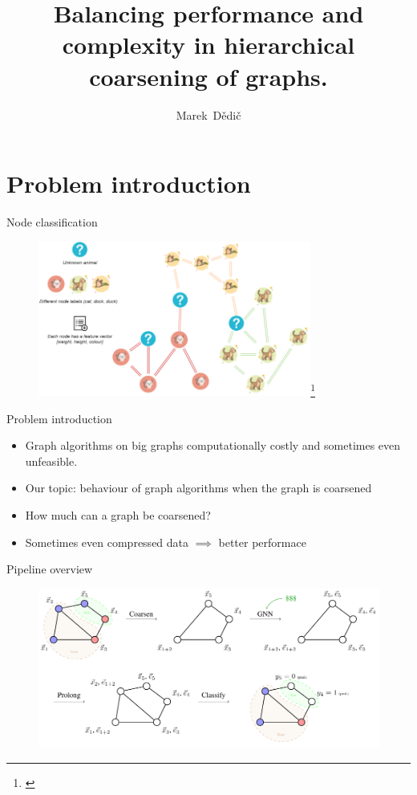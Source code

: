 \documentclass[10pt]{beamer}
\title[Q2\_3 Quarterly research review]
{
	Balancing performance and complexity in hierarchical coarsening of graphs.
}
\date[June 2022]{\displaydate{presentation}}
\author[Marek Dědič]
{
	Marek~Dědič
}
\institute[Cisco]{}
\begin{document}
\begin{frame}
	\titlepage
\end{frame}

\section{Problem introduction}

\begin{frame}{Node classification}
	\begin{figure}
		\centering
		\includegraphics[width=0.8\textwidth]{images/node_classification.png}\footnote{\cite{kubara_machine_2020}}
	\end{figure}
\end{frame}

\begin{frame}{Problem introduction}
	\begin{itemize}
		\item Graph algorithms on big graphs computationally costly and sometimes even unfeasible.
		\item Our topic: behaviour of graph algorithms when the graph is coarsened
		\item How much can a graph be coarsened?
		\item Sometimes even compressed data \( \implies \) better performace
	\end{itemize}
\end{frame}

\begin{frame}{Pipeline overview}
	\begin{figure}
		\centering
		\includegraphics[width=\textwidth]{images/pipeline_overview/pipeline_overview.pdf}
	\end{figure}
\end{frame}
\end{document}
